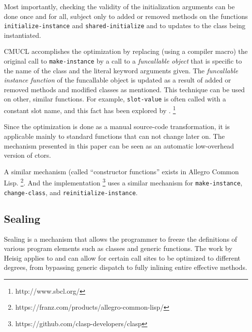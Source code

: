 Most importantly, checking the validity of the initialization
arguments can be done once and for all, subject only to added or
removed methods on the functions \texttt{initialize-instance} and
\texttt{shared-initialize} and to updates to the class being
instantiated.

CMUCL accomplishes the optimization by replacing (using a compiler
macro) the original call to \texttt{make-instance} by a call to a
\emph{funcallable object} that is specific to the name of the class
and the literal keyword arguments given.  The \emph{funcallable
  instance function} of the funcallable object is updated as a result
of added or removed methods and modified classes as mentioned.
This technique can be used on other, similar functions.  For example,
\texttt{slot-value} is often called with a constant slot name, and
this fact has been explored by \sbcl{}.%
\footnote{http://www.sbcl.org/}

Since the optimization is done as a manual source-code transformation,
it is applicable mainly to standard functions that can not change later
on.  The mechanism presented in this paper can be seen as an automatic
low-overhead version of ctors.

A similar mechanism (called ``constructor functions'' exists in
Allegro Common Lisp.%
\footnote{https://franz.com/products/allegro-common-lisp/}.  And the
\clasp{} \commonlisp{} implementation%
\footnote{https://github.com/clasp-developers/clasp}
uses a similar mechanism for \texttt{make-instance},
\texttt{change-class}, and \texttt{reinitialize-instance}.

\subsection{Sealing}

Sealing is a mechanism that allows the programmer to freeze the
definitions of various program elements such as classes and generic
functions.  The work by Heisig \cite{Heisig:2020:ELS:Sealable} applies
to \commonlisp{} and can allow for certain call sites to be
optimized to different degrees, from bypassing generic dispatch to
fully inlining entire effective methods.

